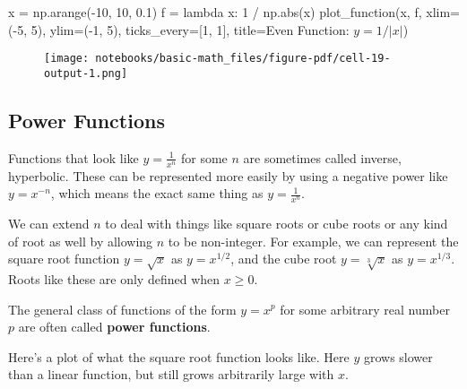 \documentclass[
  letterpaper,
  DIV=11,
  numbers=noendperiod]{scrreprt}
\newenvironment{Shaded}{\begin{snugshade}}{\end{snugshade}}
\newcommand{\BuiltInTok}[1]{\textcolor[rgb]{0.00,0.23,0.31}{#1}}
\newcommand{\DecValTok}[1]{\textcolor[rgb]{0.68,0.00,0.00}{#1}}
\newcommand{\FloatTok}[1]{\textcolor[rgb]{0.68,0.00,0.00}{#1}}
\newcommand{\KeywordTok}[1]{\textcolor[rgb]{0.00,0.23,0.31}{#1}}
\newcommand{\NormalTok}[1]{\textcolor[rgb]{0.00,0.23,0.31}{#1}}
\newcommand{\OperatorTok}[1]{\textcolor[rgb]{0.37,0.37,0.37}{#1}}
\newcommand{\StringTok}[1]{\textcolor[rgb]{0.13,0.47,0.30}{#1}}
\begin{document}
\begin{Shaded}
\begin{Highlighting}[]
\NormalTok{x }\OperatorTok{=}\NormalTok{ np.arange(}\OperatorTok{{-}}\DecValTok{10}\NormalTok{, }\DecValTok{10}\NormalTok{, }\FloatTok{0.1}\NormalTok{)}
\NormalTok{f }\OperatorTok{=} \KeywordTok{lambda}\NormalTok{ x: }\DecValTok{1} \OperatorTok{/}\NormalTok{ np.}\BuiltInTok{abs}\NormalTok{(x)}
\NormalTok{plot\_function(x, f, xlim}\OperatorTok{=}\NormalTok{(}\OperatorTok{{-}}\DecValTok{5}\NormalTok{, }\DecValTok{5}\NormalTok{), ylim}\OperatorTok{=}\NormalTok{(}\OperatorTok{{-}}\DecValTok{1}\NormalTok{, }\DecValTok{5}\NormalTok{), ticks\_every}\OperatorTok{=}\NormalTok{[}\DecValTok{1}\NormalTok{, }\DecValTok{1}\NormalTok{], }
\NormalTok{              title}\OperatorTok{=}\StringTok{\textquotesingle{}Even Function: $y=1/|x|$\textquotesingle{}}\NormalTok{)}
\end{Highlighting}
\end{Shaded}

\begin{figure}[H]

{\centering \texttt{[image: notebooks/basic-math\_files/figure-pdf/cell-19-output-1.png]}

}

\end{figure}

\hypertarget{power-functions}{%
\subsection{Power Functions}\label{power-functions}}

Functions that look like \(y=\frac{1}{x^n}\) for some \(n\) are
sometimes called inverse, hyperbolic. These can be represented more
easily by using a negative power like \(y=x^{-n}\), which means the
exact same thing as \(y=\frac{1}{x^n}\).

We can extend \(n\) to deal with things like square roots or cube roots
or any kind of root as well by allowing \(n\) to be non-integer. For
example, we can represent the square root function \(y=\sqrt{x}\) as
\(y=x^{1/2}\), and the cube root \(y=\sqrt[3]{x}\) as \(y=x^{1/3}\).
Roots like these are only defined when \(x \geq 0\).

The general class of functions of the form \(y=x^p\) for some arbitrary
real number \(p\) are often called \textbf{power functions}.

Here's a plot of what the square root function looks like. Here \(y\)
grows slower than a linear function, but still grows arbitrarily large
with \(x\).
\end{document}
